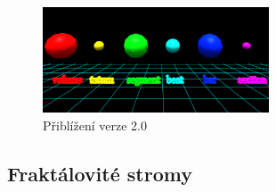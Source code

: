 \documentclass[thesis=B, czech]{FITthesis}[2019/03/06]
\makeatletter
\newenvironment{verze}[6]{ 
    \begin{table}[] 
    \begin{tabular}[t]{@{}ll@{}} 
    \toprule
      \multicolumn{2}{c}{#1}  \\ \midrule
    \multicolumn{2}{c}{          \ \ \ \ \ \ \ \
    \texttt{[image: \#5]}         \ \ \  \ \ \ \ \ 
    }         \\
    verze:            & #2      \\
    technologie:      & #3     \\
    parametry:         & \begin{tabular}[c]{@{}l@{}}#4\end{tabular}       \\ [15pt]
    krátký popis:         & \begin{tabular}[c]{@{}l@{}} #6 \end{tabular}       \\\bottomrule
    \end{tabular}
    \end{table}
    }
\makeatother
\begin{document}
\begin{figure}[b]
\centering
    \includegraphics[width=0.6\textwidth]{images/previous_versions/fraviz088.png}
    \caption{Přiblížení verze 2.0}
    \label{fig:dvanula}
\end{figure}
\newpage












\subsection*{Fraktálovité stromy}\label{fractalLikeTrees}
\end{document}
